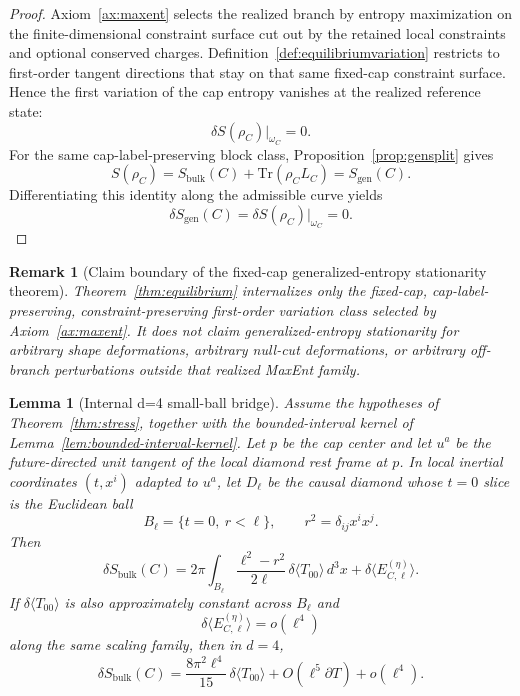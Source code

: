 \documentclass[11pt]{article}
\newtheorem{lemma}[theorem]{Lemma}
\newtheorem{remark}[theorem]{Remark}
\begin{document}
\begin{proof}
Axiom~\ref{ax:maxent} selects the realized branch by entropy maximization on the finite-dimensional constraint surface cut out by the retained local constraints and optional conserved charges. Definition~\ref{def:equilibriumvariation} restricts to first-order tangent directions that stay on that same fixed-cap constraint surface. Hence the first variation of the cap entropy vanishes at the realized reference state:
\[
\delta S(\rho_C)\big|_{\omega_C}=0.
\]
For the same cap-label-preserving block class, Proposition~\ref{prop:gensplit} gives
\[
S(\rho_C)=S_{\mathrm{bulk}}(C)+\mathrm{Tr}(\rho_C L_C)=S_{\mathrm{gen}}(C).
\]
Differentiating this identity along the admissible curve yields
\[
\delta S_{\mathrm{gen}}(C)=\delta S(\rho_C)\big|_{\omega_C}=0.
\]
\end{proof}

\begin{remark}[Claim boundary of the fixed-cap generalized-entropy stationarity theorem]
Theorem~\ref{thm:equilibrium} internalizes only the fixed-cap, cap-label-preserving, constraint-preserving first-order variation class selected by Axiom~\ref{ax:maxent}. It does not claim generalized-entropy stationarity for arbitrary shape deformations, arbitrary null-cut deformations, or arbitrary off-branch perturbations outside that realized MaxEnt family.
\end{remark}

\begin{lemma}[Internal d=4 small-ball bridge]\label{lem:smallball}
Assume the hypotheses of Theorem~\ref{thm:stress}, together with the bounded-interval kernel of Lemma~\ref{lem:bounded-interval-kernel}. Let $p$ be the cap center and let $u^a$ be the future-directed unit tangent of the local diamond rest frame at $p$. In local inertial coordinates $(t,x^i)$ adapted to $u^a$, let $D_\ell$ be the causal diamond whose $t=0$ slice is the Euclidean ball
\[
B_\ell=\{t=0,\ r<\ell\},
\qquad
r^2=\delta_{ij}x^ix^j.
\]
Then
\[
\delta S_{\mathrm{bulk}}(C)
=
2\pi\int_{B_\ell}\frac{\ell^2-r^2}{2\ell}\,\delta\langle T_{00}\rangle\,d^3x
+
\delta\langle E^{(\eta)}_{C,\ell}\rangle.
\]
If $\delta\langle T_{00}\rangle$ is also approximately constant across $B_\ell$ and
\[
\delta\langle E^{(\eta)}_{C,\ell}\rangle=o(\ell^4)
\]
along the same scaling family, then in $d=4$,
\[
\delta S_{\mathrm{bulk}}(C)
=
\frac{8\pi^2\ell^4}{15}\,\delta\langle T_{00}\rangle
+O(\ell^5\partial T)+o(\ell^4).
\]
\end{lemma}
\end{document}
